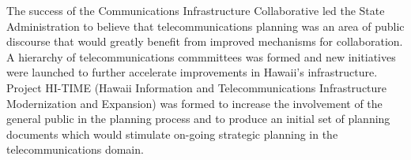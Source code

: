 The success of the Communications Infrastructure Collaborative led the
State Administration to believe that telecommunications planning was an
area of public discourse that would greatly benefit from improved
mechanisms for collaboration.  A hierarchy of telecommunications
commmittees was formed and new initiatives were launched to further
accelerate improvements in Hawaii's infrastructure.  Project HI-TIME
(Hawaii Information and Telecommunications Infrastructure Modernization and
Expansion) was formed to increase the involvement of the general public in
the planning process and to produce an initial set of planning documents
which would stimulate on-going strategic planning in the telecommunications
domain.
 

 



